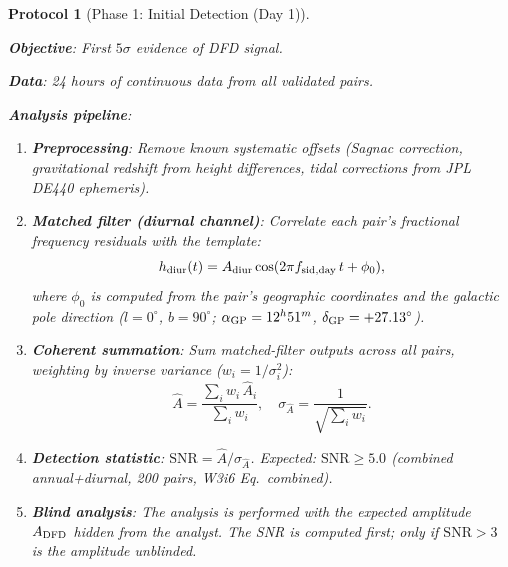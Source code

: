 \documentclass[11pt]{article}
\newtheorem{protocol}{Protocol}
\begin{document}
\begin{protocol}[Phase 1: Initial Detection (Day 1)]
\label{prot:phase1}
\mbox{}

\textbf{Objective}: First $5\sigma$ evidence of DFD signal.

\textbf{Data}: 24 hours of continuous data from all validated pairs.

\textbf{Analysis pipeline}:
\begin{enumerate}[nosep]
\item \textbf{Preprocessing}: Remove known systematic offsets (Sagnac
  correction, gravitational redshift from height differences, tidal
  corrections from JPL DE440 ephemeris).
\item \textbf{Matched filter (diurnal channel)}: Correlate each pair's
  fractional frequency residuals with the template:
  \begin{equation}
  h_{\rm diur}(t) = A_{\rm diur}\cos(2\pi f_{\rm sid,day}\,t + \phi_0),
  \end{equation}
  where $\phi_0$ is computed from the pair's geographic coordinates and
  the galactic pole direction ($l = 0^\circ$, $b = 90^\circ$;
  $\alpha_{\rm GP} = 12^h51^m$, $\delta_{\rm GP} = +27.13^\circ$).
\item \textbf{Coherent summation}: Sum matched-filter outputs across all
  pairs, weighting by inverse variance ($w_i = 1/\sigma_i^2$):
  \begin{equation}
  \hat{A} = \frac{\sum_i w_i\,\hat{A}_i}{\sum_i w_i},
  \quad
  \sigma_{\hat{A}} = \frac{1}{\sqrt{\sum_i w_i}}.
  \end{equation}
\item \textbf{Detection statistic}: $\text{SNR} = \hat{A}/\sigma_{\hat{A}}$.
  Expected: $\text{SNR} \geq 5.0$ (combined annual+diurnal, 200 pairs,
  W3i6 Eq.~combined).
\item \textbf{Blind analysis}: The analysis is performed with the expected
  amplitude $A_{\rm DFD}$ hidden from the analyst. The SNR is computed
  first; only if $\text{SNR} > 3$ is the amplitude unblinded.
\end{enumerate}


\end{protocol}
\end{document}
